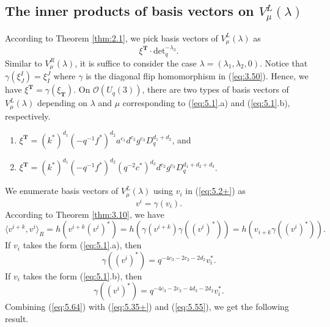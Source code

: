 \documentclass[table,a4paper,reqno]{amsart}
\numberwithin{equation}{section}
\theoremstyle{definition}
\begin{document}
\subsection{The inner products of basis vectors on $V^L_\mu(\lambda)$}
According to Theorem \ref{thm:2.1}, we pick basis vectors of $V^L_\mu(\lambda)$ as
\begin{equation}
    \xi^{\textbf{T}}\cdot\text{det}_q^{-\lambda_3}.
\end{equation}
Similar to $V^R_\mu(\lambda)$, it is suffice to consider the case $\lambda=(\lambda_1,\lambda_2,0)$. Notice that $\gamma(\xi^I_J)=\xi^J_I$ where $\gamma$ is the diagonal flip homomorphism in (\ref{eq:3.50}). Hence, we have $\xi^{\textbf{T}}=\gamma(\xi_{\textbf{T}})$. On $\mathcal{O}(U_q(3))$, there are two types of basis vectors of $V^L_\mu(\lambda)$ depending on $\lambda$ and $\mu$ corresponding to (\ref{eq:5.1}.a) and (\ref{eq:5.1}.b), respectively.
\begin{enumerate}
    \item[1)] $\xi^{\textbf{T}}=(k^*)^{d_1}(-q^{-1}f^*)^{d_2}a^{c_1}d^{c_2}g^{c_3}D_q^{d_1+d_2}$, and
    \item[2)] $\xi^{\textbf{T}}=(k^*)^{d_1}(-q^{-1}f^*)^{d_2}(q^{-2}c^*)^{d_3}d^{c_2}g^{c_3}D_q^{d_1+d_2+d_3}$.
\end{enumerate}
We enumerate basis vectors of $V^L_\mu(\lambda)$ using $v_i$ in (\ref{eq:5.2+}) as
\begin{equation}\label{eq:5.63}
    v^i=\gamma(v_i).
\end{equation}
According to Theorem \ref{thm:3.10}, we have
\begin{equation}\label{eq:5.64}
    \langle v^{i+k},v^i\rangle_R=h(v^{i+k}(v^{i})^*)=h(\gamma(v^{i+k})\gamma((v^{i})^*))=h(v_{i+k}\gamma((v^{i})^*)).
\end{equation}
If $v_i$ takes the form (\ref{eq:5.1}.a), then
\begin{equation}
    \gamma((v^{i})^*)=q^{-4c_3-2c_2-2d_2}v_i^*.
\end{equation}
If $v_i$ takes the form (\ref{eq:5.1}.b), then
\begin{equation}
    \gamma((v^{i})^*)=q^{-4c_3-2c_2-4d_3-2d_2}v_i^*.
\end{equation}
Combining (\ref{eq:5.64}) with (\ref{eq:5.35+}) and (\ref{eq:5.55}), we get the following result.
\end{document}
